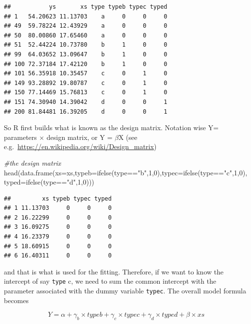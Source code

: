 \documentclass[
]{book}
\newenvironment{Shaded}{\begin{snugshade}}{\end{snugshade}}
\newcommand{\AttributeTok}[1]{\textcolor[rgb]{0.77,0.63,0.00}{#1}}
\newcommand{\CommentTok}[1]{\textcolor[rgb]{0.56,0.35,0.01}{\textit{#1}}}
\newcommand{\DecValTok}[1]{\textcolor[rgb]{0.00,0.00,0.81}{#1}}
\newcommand{\FunctionTok}[1]{\textcolor[rgb]{0.00,0.00,0.00}{#1}}
\newcommand{\NormalTok}[1]{#1}
\newcommand{\SpecialCharTok}[1]{\textcolor[rgb]{0.00,0.00,0.00}{#1}}
\newcommand{\StringTok}[1]{\textcolor[rgb]{0.31,0.60,0.02}{#1}}
\begin{document}
\begin{verbatim}
##           ys       xs type typeb typec typed
## 1   54.20623 11.13703    a     0     0     0
## 49  59.78224 12.43929    a     0     0     0
## 50  80.00860 17.65460    a     0     0     0
## 51  52.44224 10.73780    b     1     0     0
## 99  64.03652 13.09647    b     1     0     0
## 100 72.37184 17.42120    b     1     0     0
## 101 56.35918 10.35457    c     0     1     0
## 149 93.28892 19.80787    c     0     1     0
## 150 77.14469 15.76813    c     0     1     0
## 151 74.30940 14.39042    d     0     0     1
## 200 81.84481 16.39205    d     0     0     1
\end{verbatim}

So R first builds what is known as the design matrix. Notation wise Y= parameters \(\times\) design matrix, or Y = \(\beta\)X (see e.g.~\url{https://en.wikipedia.org/wiki/Design_matrix})

\begin{Shaded}
\begin{Highlighting}[]
\CommentTok{\#the design matrix}
\FunctionTok{head}\NormalTok{(}\FunctionTok{data.frame}\NormalTok{(}\AttributeTok{xs=}\NormalTok{xs,}\AttributeTok{typeb=}\FunctionTok{ifelse}\NormalTok{(type}\SpecialCharTok{==}\StringTok{"b"}\NormalTok{,}\DecValTok{1}\NormalTok{,}\DecValTok{0}\NormalTok{),}\AttributeTok{typec=}\FunctionTok{ifelse}\NormalTok{(type}\SpecialCharTok{==}\StringTok{"c"}\NormalTok{,}\DecValTok{1}\NormalTok{,}\DecValTok{0}\NormalTok{),}\AttributeTok{typed=}\FunctionTok{ifelse}\NormalTok{(type}\SpecialCharTok{==}\StringTok{"d"}\NormalTok{,}\DecValTok{1}\NormalTok{,}\DecValTok{0}\NormalTok{)))}
\end{Highlighting}
\end{Shaded}

\begin{verbatim}
##         xs typeb typec typed
## 1 11.13703     0     0     0
## 2 16.22299     0     0     0
## 3 16.09275     0     0     0
## 4 16.23379     0     0     0
## 5 18.60915     0     0     0
## 6 16.40311     0     0     0
\end{verbatim}

and that is what is used for the fitting. Therefore, if we want to know the intercept of say \texttt{type} c, we need to sum the common intercept with the parameter associated with the dummy variable \texttt{typec}. The overall model formula becomes

\[Y= \alpha + \gamma_b × typeb + \gamma_c × typec + \gamma_d × typed +  \beta × xs
\]
\end{document}
